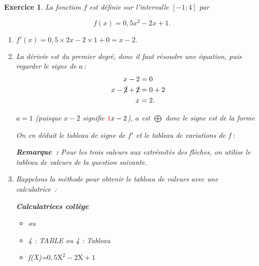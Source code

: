 \documentclass[10pt]{article}
\newtheorem{exo}{Exercice}
\begin{document}
\begin{exo}

La fonction $f$ est définie sur l'intervalle $\left[-1;4\right]$ par

\[ f(x) = 0,5x^2-2x+1.\]

\begin{enumerate}
\item $f'(x)=0,5\times 2x-2\times 1+0=x-2.$
\item La dérivée est du premier degré, donc il faut résoudre une équation, puis regarder le signe de $a~:$
\begin{align*}x-2&=0\\
 x-\cancel{2}+\cancel{2}&=0+2\\
 x&=2.
 \end{align*}

$a=1$ (puisque $x-2$ signifie $\textcolor{red}{1}x-2$), $a$ est $\bigoplus$ donc le signe est de la forme \fbox{$-~\upphi~+$}

\medskip


On en déduit le tableau de signe de $f'$ et le tableau de variations de $f~:$


\medskip

\begin{center}
\end{center}

\medskip

\textbf{Remarque~:} Pour les trois valeurs aux extrémités des flèches, on utilise le tableau de valeurs de la question suivante.
\item 

Rappelons la méthode pour obtenir le tableau de valeurs avec une calculatrice~:

\setlength{\columnseprule}{1pt}
\begin{multicols}{3}

\begin{center}
\textbf{Calculatrices collège}
\end{center}

\begin{itemize}
\item[\textbullet]  ou 
\item[\textbullet] 4 : TABLE ou 4 : Tableau
\item[\textbullet] f(X)=$0,5\text{X}^2-2\text{X}+1$ 


\end{itemize}
\end{multicols}
\end{enumerate}
\end{exo}
\end{document}

